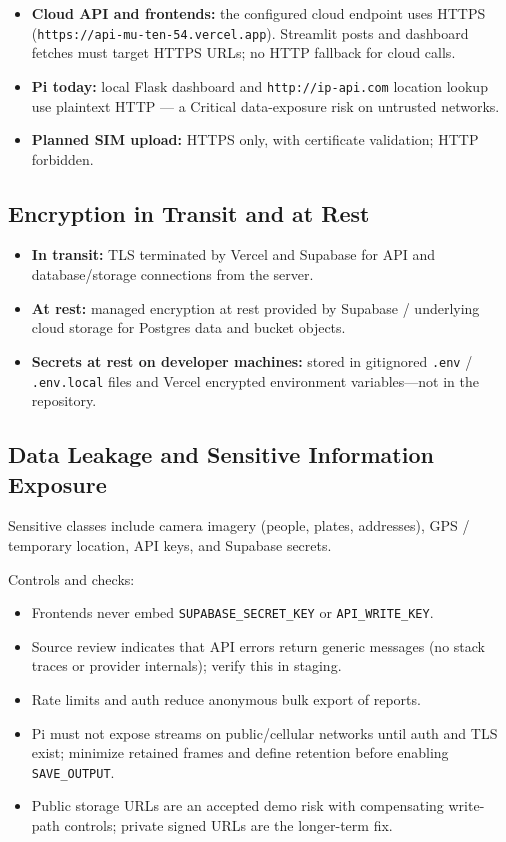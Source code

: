 \documentclass[12pt]{article}
\begin{document}
\begin{itemize}
    \item \textbf{Cloud API and frontends:} the configured cloud endpoint uses HTTPS
          (\texttt{https://api-mu-ten-54.vercel.app}). Streamlit posts and
          dashboard fetches must target HTTPS URLs; no HTTP fallback for cloud
          calls.
    \item \textbf{Pi today:} local Flask dashboard and
          \texttt{http://ip-api.com} location lookup use plaintext HTTP --- a
          Critical data-exposure risk on untrusted networks.
    \item \textbf{Planned SIM upload:} HTTPS only, with certificate validation;
          HTTP forbidden.
\end{itemize}

\subsection{Encryption in Transit and at Rest}

\begin{itemize}
    \item \textbf{In transit:} TLS terminated by Vercel and Supabase for API and
          database/storage connections from the server.
    \item \textbf{At rest:} managed encryption at rest provided by Supabase /
          underlying cloud storage for Postgres data and bucket objects.
    \item \textbf{Secrets at rest on developer machines:} stored in gitignored
          \texttt{.env} / \texttt{.env.local} files and Vercel encrypted
          environment variables---not in the repository.
\end{itemize}

\subsection{Data Leakage and Sensitive Information Exposure}

Sensitive classes include camera imagery (people, plates, addresses), GPS /
temporary location, API keys, and Supabase secrets.

Controls and checks:

\begin{itemize}
    \item Frontends never embed \texttt{SUPABASE\_SECRET\_KEY} or
          \texttt{API\_WRITE\_KEY}.
    \item Source review indicates that API errors return generic messages (no stack
          traces or provider internals); verify this in staging.
    \item Rate limits and auth reduce anonymous bulk export of reports.
    \item Pi must not expose streams on public/cellular networks until auth and
          TLS exist; minimize retained frames and define retention before
          enabling \texttt{SAVE\_OUTPUT}.
    \item Public storage URLs are an accepted demo risk with compensating
          write-path controls; private signed URLs are the longer-term fix.
\end{itemize}
\end{document}
